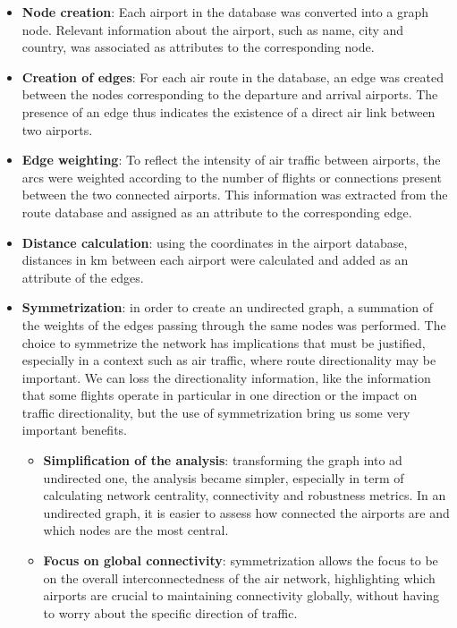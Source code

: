 \documentclass[12pt]{article}
\begin{document}
\begin{itemize}
\begin{itemize}
            \end{itemize}
        \item \textbf{Node creation}: Each airport in the database was converted into a graph node. Relevant information about the airport, such as name, city and country, was associated as attributes to the corresponding node.
        \item \textbf{Creation of edges}: For each air route in the database, an edge was created between the nodes corresponding to the departure and arrival airports. The presence of an edge thus indicates the existence of a direct air link between two airports.
        \item \textbf{Edge weighting}: To reflect the intensity of air traffic between airports, the arcs were weighted according to the number of flights or connections present between the two connected airports. This information was extracted from the route database and assigned as an attribute to the corresponding edge.
        \item \textbf{Distance calculation}: using the coordinates in the airport database, distances in km between each airport were calculated and added as an attribute of the edges.
        \item \textbf{Symmetrization}: in order to create an undirected graph, a summation of the weights of the edges passing through the same nodes was performed.
        The choice to symmetrize the network has implications that must be justified, especially in a context such as air traffic, where route directionality may be important. 
        We can loss the directionality information, like the information that some flights operate in particular in one direction or the impact on traffic directionality, but the use of symmetrization bring us some very important benefits.
            \begin{itemize}
                \item \textbf{Simplification of the analysis}: transforming the graph into ad undirected one, the analysis became simpler, especially in term of calculating network centrality, connectivity and robustness metrics.
                In an undirected graph, it is easier to assess how connected the airports are and which nodes are the most central.
                \item \textbf{Focus on global connectivity}: symmetrization allows the focus to be on the overall interconnectedness of the air network, highlighting which airports are crucial to maintaining connectivity globally, without having to worry about the specific direction of traffic.

\end{itemize}
\end{itemize}
\end{document}
